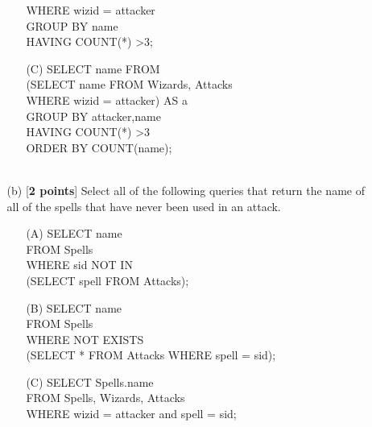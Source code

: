 \documentclass[10pt]{article}
\begin{document}
\begin{enumerate}
\begin{enumerate}
\begin{enumerate}
                        WHERE wizid = attacker\\
                        GROUP BY name\\
                        HAVING COUNT(*) \textgreater 3;\\
                    \item[(C)] SELECT name FROM\\
                        \quad (SELECT name FROM Wizards, Attacks\\
                        \quad\quad WHERE wizid = attacker) AS a\\
                        GROUP BY attacker,name\\
                        HAVING COUNT(*) \textgreater 3\\
                        ORDER BY COUNT(name);\\
                        \\
                \end{enumerate}
            \item[(b)] [\textbf{2 points}] Select all of the following queries that return the name of all of the spells that have never
                been used in an attack.\\
                \begin{enumerate}
                    \item[(A)] SELECT name\\
                        FROM Spells\\
                        WHERE sid NOT IN\\
                        (SELECT spell FROM Attacks);\\
                    \item[(B)] SELECT name\\
                        FROM Spells\\
                        WHERE NOT EXISTS\\
                        (SELECT * FROM Attacks WHERE spell = sid);\\
                    \item[(C)] SELECT Spells.name\\
                        FROM Spells, Wizards, Attacks\\
                        WHERE wizid = attacker and spell = sid;\\ \\ \\ \\ \\ \\
                \end{enumerate}
        \end{enumerate}


\end{enumerate}
\end{document}
